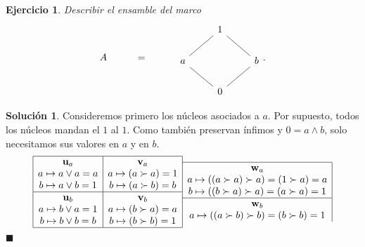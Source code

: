 \documentclass[12pt,letterpaper,titlepage]{article}
\newcommand{\xqed}[1]{%
  \leavevmode\unskip\penalty9999 \hbox{}\nobreak\hfill
  \quad\hbox{\ensuremath{#1}}}
\newtheorem{exe}{Ejercicio}
\theoremstyle{definition}
\newtheorem*{soltemp}{Solución}
\newenvironment{sol}[1]{%
    \begin{soltemp}#1}{%
    \xqed{\blacksquare}\end{soltemp}%
}
\renewcommand\sup{\vee}
\renewcommand\inf{\wedge}
\newcommand\unuc[1]{\mathbf u_{#1}}
\newcommand\vnuc[1]{\mathbf v_{#1}}
\newcommand\wnuc[1]{\mathbf w_{#1}}
\newcommand\<{\langle}
\renewcommand\>{\rangle}
\begin{document}
\begin{exe}%
  Describir el ensamble del marco
  \[
    A\hspace{10mm} = \hspace{10mm}
    \begin{tikzcd}
      & 1 \\
      a \ar[ur,no head] && b\ar[ul,no head] \\
      & 0 \ar[ur,no head] \ar[ul,no head]
    \end{tikzcd}
  .\]
\end{exe}
\begin{sol}
    Consideremos primero los núcleos asociados a $a$.
    Por supuesto, todos los núcleos mandan el $1$ al $1$.
    Como también preservan ínfimos y $0=a\inf b$,
    solo necesitamos sus valores en $a$ y en $b$.
   \[ 
        \begin{array}{|c|}
            \hline
            \unuc a \\
            a\mapsto a\sup a = a \\
            b\mapsto a\sup b = 1 \\ \hline
            \unuc b \\
            a\mapsto b\sup a = 1 \\
            b\mapsto b\sup b = b \\
            \hline
        \end{array}
        \begin{array}{c|}
            \hline
            \vnuc a \\
            a\mapsto (a\succ a) = 1 \\
            b\mapsto (a\succ b) = b \\ \hline
            \vnuc b \\
            a\mapsto (b\succ a) = a \\
            b\mapsto (b\succ b) = 1 \\
            \hline
        \end{array}
        \begin{array}{c|}
            \hline
            \wnuc a \\
            a\mapsto ((a\succ a)\succ a) = (1\succ a) = a \\
            b\mapsto ((b\succ a)\succ a) = (a\succ a) = 1 \\
            \hline
            \wnuc b \\
            a\mapsto ((a\succ b)\succ b) = (b\succ b) = 1 \\

\end{array}\]
\end{sol}
\end{document}
